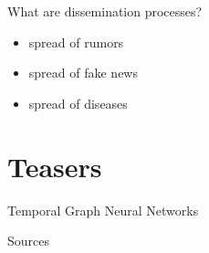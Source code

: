 \documentclass{beamer}
\begin{document}
\begin{frame}{What are dissemination processes?}
	\begin{itemize}
		\item spread of rumors
		\item spread of fake news
		\item spread of diseases
	\end{itemize}
\end{frame}

\section{Teasers}
\begin{frame}{Temporal Graph Neural Networks}
\end{frame}

\begin{frame}{Sources}
	\printbibliography
\end{frame}
\end{document}

